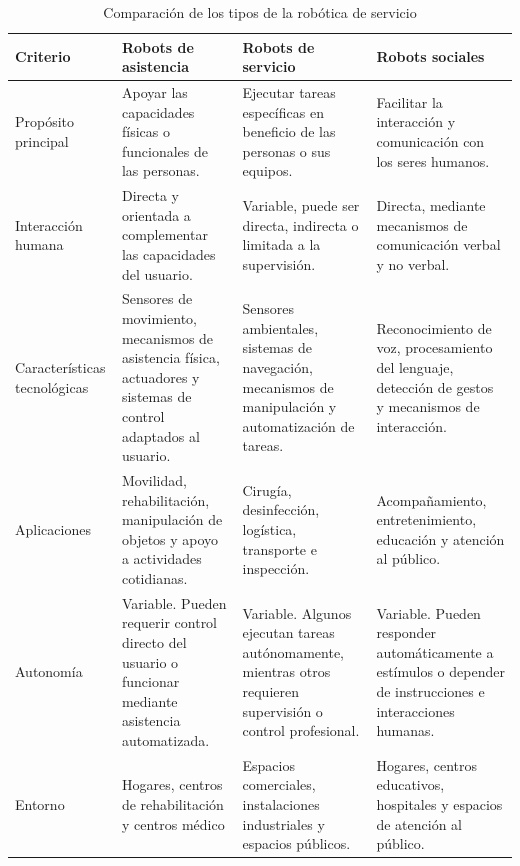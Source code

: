 \documentclass[11pt,a4paper]{article}
\renewcommand{\arraystretch}{1.18}
\begin{document}
\begin{table}[ht]
\centering
\caption{Comparación de los tipos de la robótica de servicio}
\label{tab:comparacion_robots}
\small
\renewcommand{\arraystretch}{1.4}
\begin{tabularx}{\textwidth}{
    |>{\raggedright\arraybackslash}p{2.3cm}
    |>{\raggedright\arraybackslash}X
    |>{\raggedright\arraybackslash}X
    |>{\raggedright\arraybackslash}X|}
\hline
\textbf{Criterio} &
\textbf{Robots de asistencia} &
\textbf{Robots de servicio} &
\textbf{Robots sociales} \\ \hline

Propósito principal &
Apoyar las capacidades físicas o funcionales de las personas. &
Ejecutar tareas específicas en beneficio de las personas o sus equipos. &
Facilitar la interacción y comunicación con los seres humanos. \\ \hline

Interacción humana &
Directa y orientada a complementar las capacidades del usuario. &
Variable, puede ser directa, indirecta o limitada a la supervisión. &
Directa, mediante mecanismos de comunicación verbal y no verbal. \\ \hline

Características tecnológicas &
Sensores de movimiento, mecanismos de asistencia física, actuadores y sistemas de control adaptados al usuario. &
Sensores ambientales, sistemas de navegación, mecanismos de manipulación y automatización de tareas. &
Reconocimiento de voz, procesamiento del lenguaje, detección de gestos y mecanismos de interacción. \\ \hline

Aplicaciones &
Movilidad, rehabilitación, manipulación de objetos y apoyo a actividades cotidianas. &
Cirugía, desinfección, logística, transporte e inspección. &
Acompañamiento, entretenimiento, educación y atención al público. \\ \hline

Autonomía &
Variable. Pueden requerir control directo del usuario o funcionar mediante asistencia automatizada. &
Variable. Algunos ejecutan tareas autónomamente, mientras otros requieren supervisión o control profesional. &
Variable. Pueden responder automáticamente a estímulos o depender de instrucciones e interacciones humanas. \\ \hline

Entorno &
Hogares, centros de rehabilitación y centros médico &
Espacios comerciales, instalaciones industriales y espacios públicos. &
Hogares, centros educativos, hospitales y espacios de atención al público. \\ \hline

\end{tabularx}
\end{table}
\end{document}
